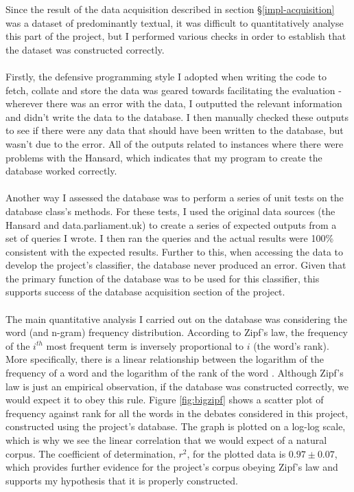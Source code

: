 \documentclass[12pt,a4paper,twoside,openright]{report}
\begin{document}
Since the result of the data acquisition described in section \S\ref{impl-acquisition} was a dataset of predominantly textual, it was difficult to quantitatively analyse this part of the project, but I performed various checks in order to establish that the dataset was constructed correctly.
\\\\
Firstly, the defensive programming style I adopted when writing the code to fetch, collate and store the data was geared towards facilitating the evaluation - wherever there was an error with the data, I outputted the relevant information and didn't write the data to the database. I then manually checked these outputs to see if there were any data that should have been written to the database, but wasn't due to the error. All of the outputs related to instances where there were problems with the Hansard, which indicates that my program to create the database worked correctly.
\\\\
Another way I assessed the database was to perform a series of unit tests on the database class's methods. For these tests, I used the original data sources (the Hansard and data.parliament.uk) to create a series of expected outputs from a set of queries I wrote. I then ran the queries and the actual results were 100\% consistent with the expected results. Further to this, when accessing the data to develop the project's classifier, the database never produced an error. Given that the primary function of the database was to be used for this classifier, this supports success of the database acquisition section of the project.
\\\\
The main quantitative analysis I carried out on the database was considering the word (and n-gram) frequency distribution. According to Zipf's law, the frequency of the $i^{th}$ most frequent term is inversely proportional to $i$ (the word's rank). More specifically, there is a linear relationship between the logarithm of the frequency of a word and the logarithm of the rank of the word \cite{zipf}. Although Zipf's law is just an empirical observation, if the database was constructed correctly, we would expect it to obey this rule. Figure \ref{fig:bigzipf} shows a scatter plot of frequency against rank for all the words in the debates considered in this project, constructed using the project's database. The graph is plotted on a log-log scale, which is why we see the linear correlation that we would expect of a natural corpus. The coefficient of determination, $r^2$, for the plotted data is $0.97 \pm 0.07$\footnotemark, which provides further evidence for the project's corpus obeying Zipf's law and supports my hypothesis that it is properly constructed.
\end{document}
